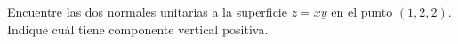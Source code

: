 Encuentre las dos normales unitarias a la superficie $z=xy$ en el punto $(1,2,2)$. Indique cuál tiene componente vertical positiva.

